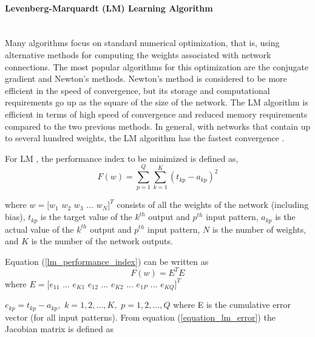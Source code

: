 \documentclass[12pt,a4paper,oneside]{article}
\numberwithin{equation}{section}
\numberwithin{algorithm}{section}
\begin{document}
\paragraph{Levenberg-Marquardt (LM) Learning Algorithm \\\\}\label{lm_algorithm}


Many algorithms focus on standard numerical optimization, that is, using alternative methods for computing the weights associated with network connections. The most popular algorithms for this optimization are the conjugate gradient and Newton’s methods. Newton’s method is considered to be more efficient in the speed of convergence, but its storage and  computational requirements go up as the square of the size of the network.
The LM algorithm is efficient in terms of high speed of convergence and reduced memory requirements compared to the two previous methods. In general, with networks that contain up to several hundred weights, the LM algorithm has the fastest convergence \cite{Hagan1994}.

For LM , the performance index to be minimized is defined as,
\begin{equation}\label{lm_performance_index}
F(w)=\sum\limits_{p=1}^{Q}{\sum\limits_{k=1}^{K}(t_{kp}-a_{kp})^2}
\end{equation}

where $w=[w_1 $ $ w_2 $ $ w_3 $ $ ...$ $  w_N]^T$ consists of all the weights of the network (including bias), $t_{kp}$ is the target value of the $k^{th}$ output and $p^{th}$ input pattern, $a_{kp}$ is the actual value of the $k^{th}$ output and $p^{th}$ input pattern, $N$ is the number of weights, and $K$ is the number of the network outputs.

Equation (\ref{lm_performance_index}) can be written as
\begin{equation}\label{equation_lm_error}
F(w)=E^TE
\end{equation}
where
$ E=[e_{11}$ $...$ $ e_{K1} $ $ e_{12}$ $...$ $ e_{K2}$ $ ...$ $ e_{1P} $ $...$ $ e_{KQ}]^T$

$ e_{kp}=t_{kp}-a_{kp}, $ $ k=1,2,...,K, $ $ p=1,2,...,Q$
where E is the cumulative error vector (for all input patterns).
From equation (\ref{equation_lm_error}) the Jacobian matrix is defined as
\end{document}
